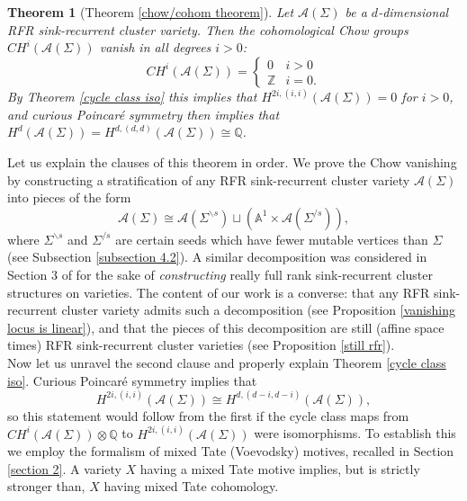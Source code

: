 \documentclass[11pt]{amsart}
\newtheorem{thm}{Theorem}[section]
\theoremstyle{definition}
\theoremstyle{remark}
\numberwithin{equation}{section}
\begin{document}
\begin{thm}[Theorem \ref{chow/cohom theorem}]
    Let $\mathcal{A}(\Sigma)$ be a $d$-dimensional RFR sink-recurrent cluster variety. Then the cohomological Chow groups $CH^i(\mathcal{A}(\Sigma))$ vanish in all degrees $i > 0$: 
     \begin{equation}
        CH^i(\mathcal{A}(\Sigma)) = \begin{cases}  0 & i > 0 \\
    \mathbb{Z} & i = 0.
   \end{cases} \end{equation} By Theorem \ref{cycle class iso} this implies that $H^{2i, (i, i)}(\mathcal{A}(\Sigma)) = 0$ for $i > 0$, and curious Poincar\'e symmetry then implies that
    $H^d(\mathcal{A}(\Sigma)) = H^{d, (d, d)}(\mathcal{A}(\Sigma)) \cong \mathbb{Q}$.
\end{thm}

Let us explain the clauses of this theorem in order. We prove the Chow vanishing by constructing a stratification of any RFR sink-recurrent cluster variety $\mathcal{A}(\Sigma)$ into pieces of the form \begin{equation}
    \mathcal{A}(\Sigma) \cong \mathcal{A}(\Sigma^{\backslash s}) \sqcup (\mathbb{A}^1 \times \mathcal{A}(\Sigma^{/s})),
\end{equation}
where $\Sigma^{\backslash s}$ and $\Sigma^{/s}$ are certain seeds which have fewer mutable vertices than $\Sigma$ (see Subsection \ref{subsection 4.2}). A similar decomposition was considered in Section 3 of \cite{galashin2026braid} for the sake of \textit{constructing} really full rank sink-recurrent cluster structures on varieties. The content of our work is a converse: that any RFR sink-recurrent cluster variety admits such a decomposition (see Proposition \ref{vanishing locus is linear}), and that the pieces of this decomposition are still (affine space times) RFR sink-recurrent cluster varieties (see Proposition \ref{still rfr}).\\

Now let us unravel the second clause and properly explain Theorem \ref{cycle class iso}. Curious Poincar\'e symmetry implies that \begin{equation}
    H^{2i, (i, i)}(\mathcal{A}(\Sigma)) \cong H^{d, (d-i, d-i)}(\mathcal{A}(\Sigma)),
\end{equation}
so this statement would follow from the first if the cycle class maps from $CH^i(\mathcal{A}(\Sigma)) \otimes \mathbb{Q}$ to $H^{2i, (i, i)}(\mathcal{A}(\Sigma))$ were isomorphisms. To establish this we employ the formalism of mixed Tate (Voevodsky) motives, recalled in Section \ref{section 2}. A variety $X$ having a mixed Tate motive implies, but is strictly stronger than, $X$ having mixed Tate cohomology.\\
\end{document}
